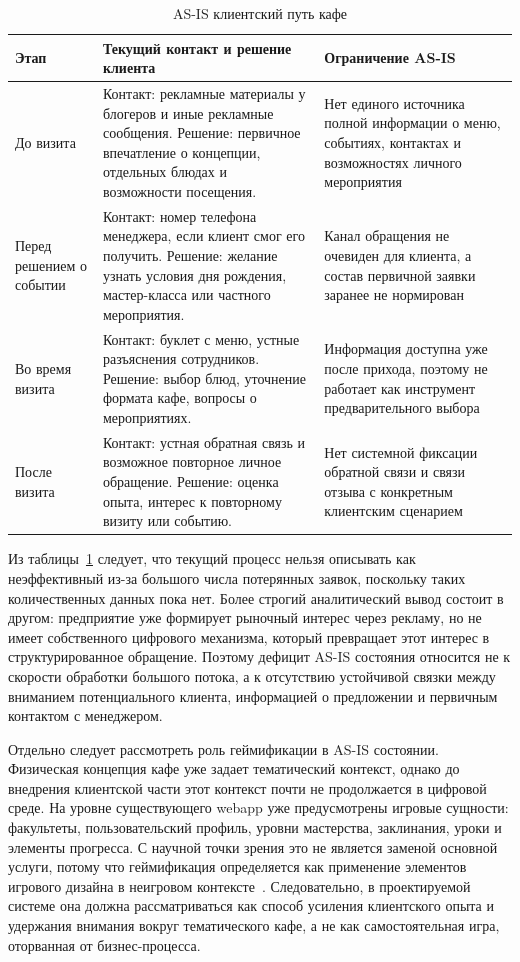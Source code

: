 \begin{table}[H]
\centering
\small
\caption{AS-IS клиентский путь кафе}
\label{tab:v2_asis_customer_journey}
\begin{tabularx}{\textwidth}{|>{\raggedright\arraybackslash}p{}|>{\raggedright\arraybackslash}p{}|>{\raggedright\arraybackslash}X|}
\hline
\textbf{Этап} & \textbf{Текущий контакт и решение клиента} & \textbf{Ограничение AS-IS} \\ \hline
До визита & Контакт: рекламные материалы у блогеров и иные рекламные сообщения. Решение: первичное впечатление о концепции, отдельных блюдах и возможности посещения. & Нет единого источника полной информации о меню, событиях, контактах и возможностях личного мероприятия \\ \hline
Перед решением о событии & Контакт: номер телефона менеджера, если клиент смог его получить. Решение: желание узнать условия дня рождения, мастер-класса или частного мероприятия. & Канал обращения не очевиден для клиента, а состав первичной заявки заранее не нормирован \\ \hline
Во время визита & Контакт: буклет с меню, устные разъяснения сотрудников. Решение: выбор блюд, уточнение формата кафе, вопросы о мероприятиях. & Информация доступна уже после прихода, поэтому не работает как инструмент предварительного выбора \\ \hline
После визита & Контакт: устная обратная связь и возможное повторное личное обращение. Решение: оценка опыта, интерес к повторному визиту или событию. & Нет системной фиксации обратной связи и связи отзыва с конкретным клиентским сценарием \\ \hline
\end{tabularx}
\normalsize
\end{table}

Из таблицы~\ref{tab:v2_asis_customer_journey} следует, что текущий процесс нельзя описывать как неэффективный из-за большого числа потерянных заявок, поскольку таких количественных данных пока нет. Более строгий аналитический вывод состоит в другом: предприятие уже формирует рыночный интерес через рекламу, но не имеет собственного цифрового механизма, который превращает этот интерес в структурированное обращение. Поэтому дефицит AS-IS состояния относится не к скорости обработки большого потока, а к отсутствию устойчивой связки между вниманием потенциального клиента, информацией о предложении и первичным контактом с менеджером.

Отдельно следует рассмотреть роль геймификации в AS-IS состоянии. Физическая концепция кафе уже задает тематический контекст, однако до внедрения клиентской части этот контекст почти не продолжается в цифровой среде. На уровне существующего webapp уже предусмотрены игровые сущности: факультеты, пользовательский профиль, уровни мастерства, заклинания, уроки и элементы прогресса. С научной точки зрения это не является заменой основной услуги, потому что геймификация определяется как применение элементов игрового дизайна в неигровом контексте~\cite{deterding2011}. Следовательно, в проектируемой системе она должна рассматриваться как способ усиления клиентского опыта и удержания внимания вокруг тематического кафе, а не как самостоятельная игра, оторванная от бизнес-процесса.

